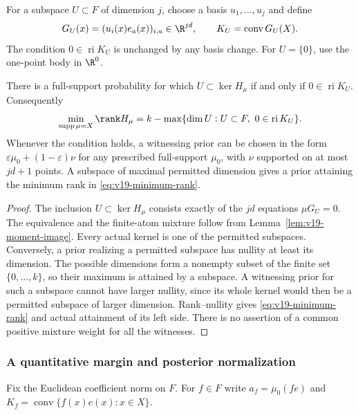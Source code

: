 For a subspace $U\subset F$ of dimension $j$, choose a basis
$u_1,\ldots,u_j$ and define
\[
 G_U(x)=(u_i(x)e_a(x))_{i,a}\in\R^{jd},\qquad
 K_U=\operatorname{conv}G_U(X).
\]
The condition $0\in\operatorname{ri}K_U$ is unchanged by any basis
change. For $U=\{0\}$, use the one-point body in $\R^0$.

\begin{theorem}
\label{thm:v19-rank-alternative}
There is a full-support probability for which $U\subset\ker H_\mu$
if and only if $0\in\operatorname{ri}K_U$. Consequently
\begin{equation}\label{eq:v19-minimum-rank}
 \min_{\operatorname{supp}\mu=X}\rank H_\mu
 = k-\max\{\dim U:U\subset F,\ 0\in\operatorname{ri}K_U\}.
\end{equation}
Whenever the condition holds, a witnessing prior can be chosen in the
form $\varepsilon\mu_0+(1-\varepsilon)\nu$ for any prescribed
full-support $\mu_0$, with $\nu$ supported on at most $jd+1$ points.
A subspace of maximal permitted dimension gives a prior attaining the
minimum rank in \eqref{eq:v19-minimum-rank}.
\end{theorem}
\begin{proof}
The inclusion $U\subset\ker H_\mu$ consists exactly of the $jd$
equations $\mu G_U=0$. The equivalence and the finite-atom mixture
follow from Lemma~\ref{lem:v19-moment-image}. Every actual kernel is
one of the permitted subspaces. Conversely, a prior realizing a
permitted subspace has nullity at least its dimension. The possible
dimensions form a nonempty subset of the finite set $\{0,\ldots,k\}$,
so their maximum is attained by a subspace. A witnessing prior for
such a subspace cannot have larger nullity, since its whole kernel
would then be a permitted subspace of larger dimension. Rank--nullity
gives \eqref{eq:v19-minimum-rank} and actual attainment of its left
side. There is no assertion of a common positive mixture weight for
all the witnesses.
\end{proof}

\subsubsection{A quantitative margin and posterior normalization}
Fix the Euclidean coefficient norm on $F$. For $f\in F$ write
$a_f=\mu_0(f e)$ and $K_f=\operatorname{conv}\{f(x)e(x):x\in X\}$.

